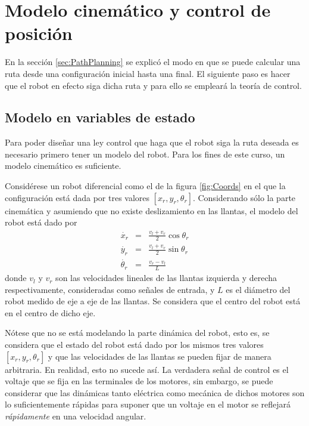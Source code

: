 \documentclass[a4paper]{article}
\begin{document}
\section{Modelo cinemático y control de posición}
\label{sec:Control}
En la sección \ref{sec:PathPlanning} se explicó el modo en que se puede calcular una ruta desde una configuración inicial hasta una final. El siguiente paso es hacer que el robot en efecto siga dicha ruta y para ello se empleará la teoría de control. 

\subsection{Modelo en variables de estado}
Para poder diseñar una ley control que haga que el robot siga la ruta deseada es necesario primero tener un modelo del robot. Para los fines de este curso, un modelo cinemático es suficiente. 

Considérese un robot diferencial como el de la figura \ref{fig:Coords} en el que la configuración está dada por tres valores $\left[x_r, y_r, \theta_r\right]$. Considerando sólo la parte cinemática y asumiendo que no existe deslizamiento en las llantas, el modelo del robot está dado por
\begin{eqnarray}                                                                                                                        
\dot{x_r} &=& \frac{v_l + v_r}{2}\cos\theta_r\label{eq:Kinematic1}\\                                                                        
\dot{y_r} &=& \frac{v_l + v_r}{2}\sin\theta_r\\                                                                                             
\dot{\theta_r} &=& \frac{v_r - v_l}{L}\label{eq:Kinematic3}                                                                               
\end{eqnarray}
donde $v_l$ y $v_r$ son las velocidades lineales de las llantas izquierda y derecha respectivamente, consideradas como señales de entrada, y $L$ es el diámetro del robot medido de eje a eje de las llantas. Se considera que el centro del robot está en el centro de dicho eje.

Nótese que no se está modelando la parte dinámica del robot, esto es, se considera que el estado del robot está dado por los mismos tres valores $\left[x_r, y_r, \theta_r\right]$ y que las velocidades de las llantas se pueden fijar de manera arbitraria. En realidad, esto no sucede así. La verdadera señal de control es el voltaje que se fija en las terminales de los motores, sin embargo, se puede considerar que las dinámicas tanto eléctrica como mecánica de dichos motores son lo suficientemente rápidas para suponer que un voltaje en el motor se reflejará \textit{rápidamente} en una velocidad angular.
\end{document}
